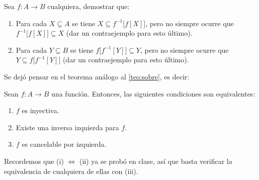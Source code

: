 \documentclass[letterpaper,DIV=14,headsepline,12pt]{scrartcl}
\begin{document}
    \begin{ejercicio}
        Sea $f:A \to B$ cualquiera, demostrar que:
        \begin{enumerate}
            \item Para cada $X \subseteq A$ se tiene $X \subseteq f^{-1}\big[ f[X] \big]$, pero no siempre ocurre que $f^{-1}\big[ f[X] \big] \subseteq X$ (dar un contraejemplo para esto último).
            \item Para cada $Y \subseteq B$ se tiene $f\big[ f^{-1}[Y] \big] \subseteq Y$, pero no siempre ocurre que $Y \subseteq f\big[ f^{-1}[Y] \big]$ (dar un contraejemplo para esto último).
        \end{enumerate}
    \end{ejercicio}

    Se dejó pensar en el teorema análogo al \autoref{teo:sobre}, es decir:
    \begin{ejercicio}
        Sean $f:A \to B$ una función. Entonces, las siguientes condiciones son equivalentes:
        \begin{enumerate}
            \item $f$ es inyectiva.
            \item Existe una inversa izquierda para $f$.
            \item $f$ es cancelable por izquierda.
        \end{enumerate}

        Recordemos que (i) $\Leftrightarrow$ (ii) ya se probó en clase, así que basta verificar la equivalencia de cualquiera de ellas con (iii).
    \end{ejercicio}




    
    
\end{document}
